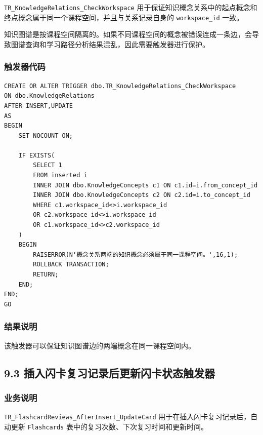 \documentclass[10pt,a4paper,fontset=none]{ctexart}
\begin{document}
\texttt{TR\_KnowledgeRelations\_CheckWorkspace} 用于保证知识概念关系中的起点概念和终点概念属于同一个课程空间，并且与关系记录自身的 \texttt{workspace\_id} 一致。\par

知识图谱是按课程空间隔离的。如果不同课程空间的概念被错误连成一条边，会导致图谱查询和学习路径分析结果混乱，因此需要触发器进行保护。\par

\subsubsection*{触发器代码}

\begin{Verbatim}[fontsize=\scriptsize,frame=single]
CREATE OR ALTER TRIGGER dbo.TR_KnowledgeRelations_CheckWorkspace
ON dbo.KnowledgeRelations
AFTER INSERT,UPDATE
AS
BEGIN
    SET NOCOUNT ON;

    IF EXISTS(
        SELECT 1
        FROM inserted i
        INNER JOIN dbo.KnowledgeConcepts c1 ON c1.id=i.from_concept_id
        INNER JOIN dbo.KnowledgeConcepts c2 ON c2.id=i.to_concept_id
        WHERE c1.workspace_id<>i.workspace_id
        OR c2.workspace_id<>i.workspace_id
        OR c1.workspace_id<>c2.workspace_id
    )
    BEGIN
        RAISERROR(N'概念关系两端的知识概念必须属于同一课程空间。',16,1);
        ROLLBACK TRANSACTION;
        RETURN;
    END;
END;
GO
\end{Verbatim}

\subsubsection*{结果说明}

该触发器可以保证知识图谱边的两端概念在同一课程空间内。\par

\subsection*{9.3 插入闪卡复习记录后更新闪卡状态触发器}

\subsubsection*{业务说明}

\texttt{TR\_FlashcardReviews\_AfterInsert\_UpdateCard} 用于在插入闪卡复习记录后，自动更新 \texttt{Flashcards} 表中的复习次数、下次复习时间和更新时间。\par
\end{document}
